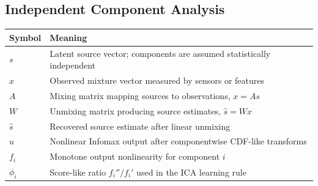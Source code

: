 \subsection*{Independent Component Analysis}

\begin{tabular}{@{}ll@{}}
  \toprule
  \textbf{Symbol} & \textbf{Meaning} \\
  \midrule
  $s$ & Latent source vector; components are assumed statistically independent \\
  $x$ & Observed mixture vector measured by sensors or features \\
  $A$ & Mixing matrix mapping sources to observations, $x=As$ \\
  $W$ & Unmixing matrix producing source estimates, $\hat{s}=Wx$ \\
  $\hat{s}$ & Recovered source estimate after linear unmixing \\
  $\hat{u}$ & Nonlinear Infomax output after componentwise CDF-like transforms \\
  $f_i$ & Monotone output nonlinearity for component $i$ \\
  $\phi_i$ & Score-like ratio $f_i''/f_i'$ used in the ICA learning rule \\
  \bottomrule
\end{tabular}
